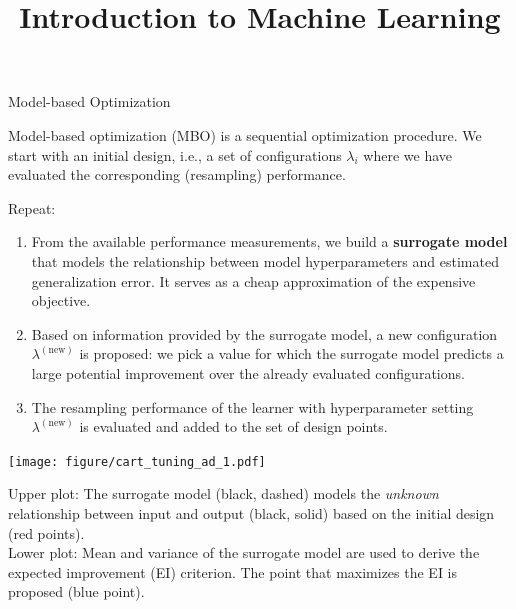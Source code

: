 \documentclass[11pt,compress,t,notes=noshow, xcolor=table]{beamer}
\title{Introduction to Machine Learning}
\institute{\href{https://compstat-lmu.github.io/lecture_i2ml/}{compstat-lmu.github.io/lecture\_i2ml}}
\date{}
\newenvironment{knitrout}{}{} %
\begin{document}








  

\sloppy

\begin{vbframe}{Model-based Optimization}

Model-based optimization (MBO) is a sequential optimization procedure. We start with an initial design, i.e., a set of configurations $\lambda_i$ where we have evaluated the corresponding (resampling) performance. 

Repeat:
  \begin{enumerate}
\item From the available performance measurements, we build a \textbf{surrogate model} that models the relationship between model hyperparameters and estimated generalization error. It serves as a cheap approximation of the expensive objective. 
\item Based on information provided by the surrogate model, a new configuration $\lambda^{(\text{new})}$ is proposed: we pick a value for which the surrogate model predicts a large potential improvement over the already evaluated configurations.
\item The resampling performance of the learner with hyperparameter setting $\lambda^{(\text{new})}$ is evaluated and added to the set of design points.  
\end{enumerate}

\framebreak 

\begin{knitrout}\scriptsize
{}\color{fgcolor}

{\centering \texttt{[image: figure/cart\_tuning\_ad\_1.pdf]} 

}


\end{knitrout}
  
  \begin{footnotesize}
Upper plot: The surrogate model (black, dashed) models the \emph{unknown} relationship between input and output (black, solid) based on the initial design (red points).\\
Lower plot: Mean and variance of the surrogate model are used to derive the expected improvement (EI) criterion. The point that maximizes the EI is proposed (blue point). 
\end{footnotesize}


\end{vbframe}
\end{document}
